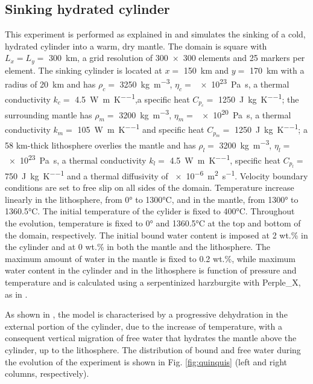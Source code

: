 \documentclass[hidelinks,11pt,a4paper]{article}
\begin{document}
\subsection{Sinking hydrated cylinder}\label{sec:quinquis}
This experiment is performed as explained in \citet{Quinquis2014} and simulates the sinking of a cold, hydrated cylinder into a warm, dry mantle. The domain is square with $L_x=L_y=$ \SI{300}{\km}, a grid resolution of \num{300x300} elements and 25 markers per element. The sinking cylinder is located at $x=$ \SI{150}{\km} and $y=$ \SI{170}{\km} with a radius of \SI{20}{\km} and has $\rho_c=$ \SI{3250}{\kg\per\cubic\m}, $\eta_c=$ \SI{e23}{\pascal\s}, a thermal conductivity $k_c=$ \SI{4.5}{\watt\per\m\per\kelvin},a specific heat $C_{p_c}=$ \SI{1250}{\joule\per\kg\per\kelvin}; the surrounding mantle has $\rho_m=$ \SI{3200}{\kg\per\cubic\m}, $\eta_m=$ \SI{e20}{\pascal\s}, a thermal conductivity $k_m=$ \SI{105}{\watt\per\m\per\kelvin} and specific heat $C_{p_m}=$ \SI{1250}{\joule\per\kg\per\kelvin}; a 58 km-thick lithosphere overlies the mantle and has $\rho_l=$ \SI{3200}{\kg\per\cubic\m}, $\eta_l=$ \SI{e23}{\pascal\s}, a thermal conductivity $k_l=$ \SI{4.5}{\watt\per\m\per\kelvin}, specific heat $C_{p_l}=$ \SI{750}{\joule\per\kg\per\kelvin} and a thermal diffusivity of \SI{e-6}{\square\m\per\s}. Velocity boundary conditions are set to free slip on all sides of the domain. Temperature increase linearly in the lithosphere, from 0° to 1300°C, and in the mantle, from 1300° to 1360.5°C. The initial temperature of the cylider is fixed to 400°C. Throughout the evolution, temperature is fixed to 0° and 1360.5°C at the top and bottom of the domain, respectively. The initial bound water content is imposed at 2 wt.\% in the cylinder and at 0 wt.\% in both the mantle and the lithosphere. The maximum amount of water in the mantle is fixed to 0.2 wt.\%, while maximum water content in the cylinder and in the lithosphere is function of pressure and temperature and is calculated using a serpentinized harzburgite with Perple\_X, as in \citet{Quinquis2014}.

As shown in \citet{Quinquis2014}, the model is characterised by a progressive dehydration in the external portion of the cylinder, due to the increase of temperature, with a consequent vertical migration of free water that hydrates the mantle above the cylinder, up to the lithosphere. The distribution of bound and free water during the evolution of the experiment is shown in Fig. \ref{fig:quinquis} (left and right columns, respectively).
\end{document}
